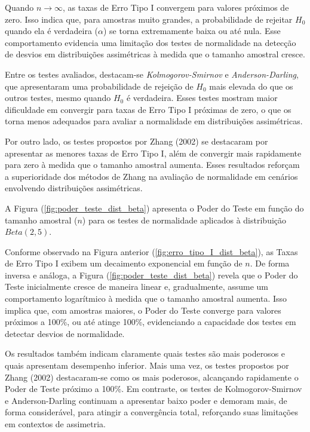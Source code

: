 \documentclass[a4paper,11pt]{article} %
\begin{document}
Quando $n \to \infty$, as taxas de Erro Tipo I convergem para valores próximos de zero. Isso indica que, para amostras muito grandes, a probabilidade de rejeitar $H_{0}$ quando ela é verdadeira ($\alpha$) se torna extremamente baixa ou até nula. Esse comportamento evidencia uma limitação dos testes de normalidade na detecção de desvios em distribuições assimétricas à medida que o tamanho amostral cresce.

Entre os testes avaliados, destacam-se \textit{Kolmogorov-Smirnov} e \textit{Anderson-Darling}, que apresentaram uma probabilidade de rejeição de $H_{0}$ mais elevada do que os outros testes, mesmo quando $H_{0}$ é verdadeira. Esses testes mostram maior dificuldade em convergir para taxas de Erro Tipo I próximas de zero, o que os torna menos adequados para avaliar a normalidade em distribuições assimétricas.

Por outro lado, os testes propostos por Zhang (2002) se destacaram por apresentar as menores taxas de Erro Tipo I, além de convergir mais rapidamente para zero à medida que o tamanho amostral aumenta. Esses resultados reforçam a superioridade dos métodos de Zhang na avaliação de normalidade em cenários envolvendo distribuições assimétricas.

\vspace{0.5cm}

A Figura (\ref{fig:poder_teste_dist_beta}) apresenta o Poder do Teste em função do tamanho amostral ($n$) para os testes de normalidade aplicados à distribuição $Beta(2, 5)$.

Conforme observado na Figura anterior (\ref{fig:erro_tipo_I_dist_beta}), as Taxas de Erro Tipo I exibem um decaimento exponencial em função de $n$. De forma inversa e análoga, a Figura (\ref{fig:poder_teste_dist_beta}) revela que o Poder do Teste inicialmente cresce de maneira linear e, gradualmente, assume um comportamento logarítmico à medida que o tamanho amostral aumenta. Isso implica que, com amostras maiores, o Poder do Teste converge para valores próximos a 100\%, ou até atinge 100\%, evidenciando a capacidade dos testes em detectar desvios de normalidade.

Os resultados também indicam claramente quais testes são mais poderosos e quais apresentam desempenho inferior. Mais uma vez, os testes propostos por Zhang (2002) destacaram-se como os mais poderosos, alcançando rapidamente o Poder de Teste próximo a 100\%. Em contraste, os testes de Kolmogorov-Smirnov e Anderson-Darling continuam a apresentar baixo poder e demoram mais, de forma considerável, para atingir a convergência total, reforçando suas limitações em contextos de assimetria.
\end{document}
